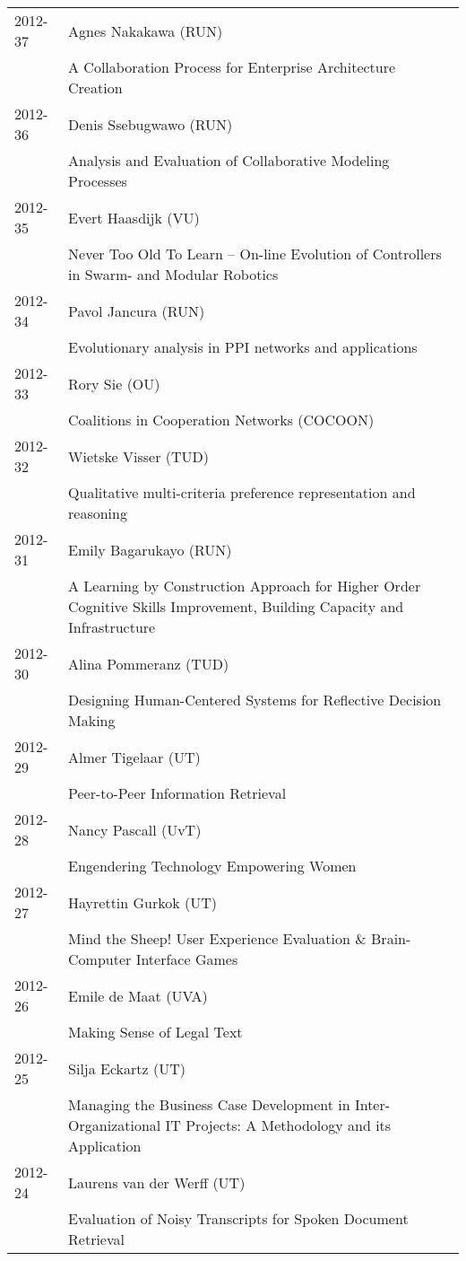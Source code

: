 \begin{longtable}{p{1.25cm}p{10.75cm}}
2012-37 & Agnes Nakakawa (RUN) \\& A Collaboration Process for Enterprise Architecture Creation \\
2012-36 & Denis Ssebugwawo (RUN) \\& Analysis and Evaluation of Collaborative Modeling Processes \\
2012-35 & Evert Haasdijk (VU) \\& Never Too Old To Learn -- On-line Evolution of Controllers in Swarm- and Modular Robotics \\
2012-34 & Pavol Jancura (RUN) \\& Evolutionary analysis in PPI networks and applications \\
2012-33 & Rory Sie (OU) \\& Coalitions in Cooperation Networks (COCOON) \\
2012-32 & Wietske Visser (TUD) \\& Qualitative multi-criteria preference representation and reasoning \\
2012-31 & Emily Bagarukayo (RUN) \\& A Learning by Construction Approach for Higher Order Cognitive Skills Improvement, Building Capacity and Infrastructure \\
2012-30 & Alina Pommeranz (TUD) \\& Designing Human-Centered Systems for Reflective Decision Making \\
2012-29 & Almer Tigelaar (UT) \\& Peer-to-Peer Information Retrieval \\
2012-28 & Nancy Pascall (UvT) \\& Engendering Technology Empowering Women \\
2012-27 & Hayrettin Gurkok (UT) \\& Mind the Sheep! User Experience Evaluation \& Brain-Computer Interface Games \\
2012-26 & Emile de Maat (UVA) \\& Making Sense of Legal Text \\
2012-25 & Silja Eckartz (UT) \\& Managing the Business Case Development in Inter-Organizational IT \newline Projects: A Methodology and its Application \\
2012-24 & Laurens van der Werff (UT) \\& Evaluation of Noisy Transcripts for Spoken Document Retrieval \\

\end{longtable}
